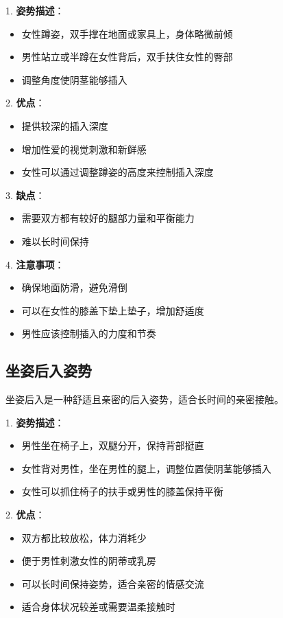 \documentclass[12pt,UTF8]{ctexbook}
\begin{document}
1. \textbf{姿势描述}：
  \begin{itemize}
  \item 女性蹲姿，双手撑在地面或家具上，身体略微前倾
  \item 男性站立或半蹲在女性背后，双手扶住女性的臀部
  \item 调整角度使阴茎能够插入
  \end{itemize}

2. \textbf{优点}：
  \begin{itemize}
  \item 提供较深的插入深度
  \item 增加性爱的视觉刺激和新鲜感
  \item 女性可以通过调整蹲姿的高度来控制插入深度
  \end{itemize}

3. \textbf{缺点}：
  \begin{itemize}
  \item 需要双方都有较好的腿部力量和平衡能力
  \item 难以长时间保持
  \end{itemize}

4. \textbf{注意事项}：
  \begin{itemize}
  \item 确保地面防滑，避免滑倒
  \item 可以在女性的膝盖下垫上垫子，增加舒适度
  \item 男性应该控制插入的力度和节奏
  \end{itemize}

\subsection{坐姿后入姿势}

坐姿后入是一种舒适且亲密的后入姿势，适合长时间的亲密接触。

1. \textbf{姿势描述}：
  \begin{itemize}
  \item 男性坐在椅子上，双腿分开，保持背部挺直
  \item 女性背对男性，坐在男性的腿上，调整位置使阴茎能够插入
  \item 女性可以抓住椅子的扶手或男性的膝盖保持平衡
  \end{itemize}

2. \textbf{优点}：
  \begin{itemize}
  \item 双方都比较放松，体力消耗少
  \item 便于男性刺激女性的阴蒂或乳房
  \item 可以长时间保持姿势，适合亲密的情感交流
  \item 适合身体状况较差或需要温柔接触时
  \end{itemize}
\end{document}
